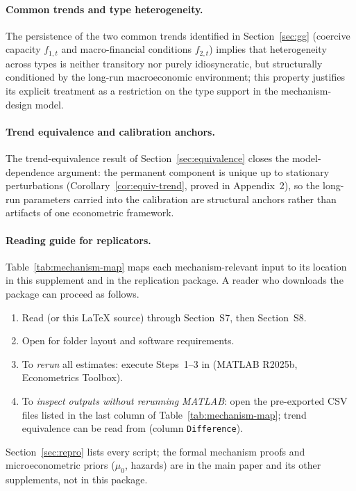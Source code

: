 \documentclass[12pt]{article}
\numberwithin{equation}{section}
\numberwithin{table}{section}
\theoremstyle{definition}
\begin{document}
\paragraph{Common trends and type heterogeneity.}
The persistence of the two common trends identified in Section~\ref{sec:gg}
(coercive capacity $f_{1,t}$ and macro-financial conditions $f_{2,t}$)
implies that heterogeneity across types is neither transitory nor purely
idiosyncratic, but structurally conditioned by the long-run macroeconomic
environment; this property justifies its explicit treatment as a restriction
on the type support in the mechanism-design model.

\paragraph{Trend equivalence and calibration anchors.}
The trend-equivalence result of Section~\ref{sec:equivalence} closes the
model-dependence argument: the permanent component is unique up to stationary
perturbations (Corollary~\ref{cor:equiv-trend}, proved in Appendix~2), so the
long-run parameters carried into the calibration are structural anchors rather
than artifacts of one econometric framework.

\paragraph{Reading guide for replicators.}
Table~\ref{tab:mechanism-map} maps each mechanism-relevant input to its
location in this supplement and in the replication package. A reader who
downloads the package can proceed as follows.
\begin{enumerate}
\item Read  (or this \LaTeX{} source) through
Section~S7, then Section~S8.
\item Open  for folder layout and software requirements.
\item To \emph{rerun} all estimates: execute Steps~1--3 in 
(MATLAB R2025b, Econometrics Toolbox).
\item To \emph{inspect outputs without rerunning MATLAB}: open the pre-exported
CSV files listed in the last column of Table~\ref{tab:mechanism-map}; trend
equivalence can be read from 
(column \texttt{Difference}).
\end{enumerate}
Section~\ref{sec:repro} lists every script; the formal mechanism proofs and
microeconometric priors ($\mu_0$, hazards) are in the main paper and its
other supplements, not in this package.
\end{document}
